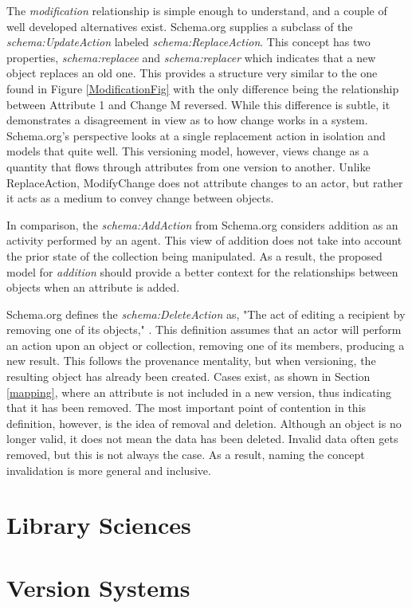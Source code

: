The \textit{modification} relationship is simple enough to understand, and a couple of well developed alternatives exist.
Schema.org supplies a subclass of the \textit{schema:UpdateAction} labeled \textit{schema:ReplaceAction}.
This concept has two properties, \textit{schema:replacee} and \textit{schema:replacer} which indicates that a new object replaces an old one.
This provides a structure very similar to the one found in Figure \ref{ModificationFig} with the only difference being the relationship between Attribute 1 and Change M reversed.
While this difference is subtle, it demonstrates a disagreement in view as to how change works in a system.
Schema.org's perspective looks at a single replacement action in isolation and models that quite well.
This versioning model, however, views change as a quantity that flows through attributes from one version to another.
Unlike ReplaceAction, ModifyChange does not attribute changes to an actor, but rather it acts as a medium to convey change between objects.

In comparison, the \textit{schema:AddAction} from Schema.org considers addition as an activity performed by an agent.
This view of addition does not take into account the prior state of the collection being manipulated.
As a result, the proposed model for \textit{addition} should provide a better context for the relationships between objects when an attribute is added.

Schema.org defines the \textit{schema:DeleteAction} as, "The act of editing a recipient by removing one of its objects," \cite{SchemaRem}.
This definition assumes that an actor will perform an action upon an object or collection, removing one of its members, producing a new result.
This follows the provenance mentality, but when versioning, the resulting object has already been created.
Cases exist, as shown in Section \ref{mapping}, where an attribute is not included in a new version, thus indicating that it has been removed.
The most important point of contention in this definition, however, is the idea of removal and deletion.
Although an object is no longer valid, it does not mean the data has been deleted.
Invalid data often gets removed, but this is not always the case.
As a result, naming the concept invalidation is more general and inclusive.

\section{Library Sciences}
\section{Version Systems}

